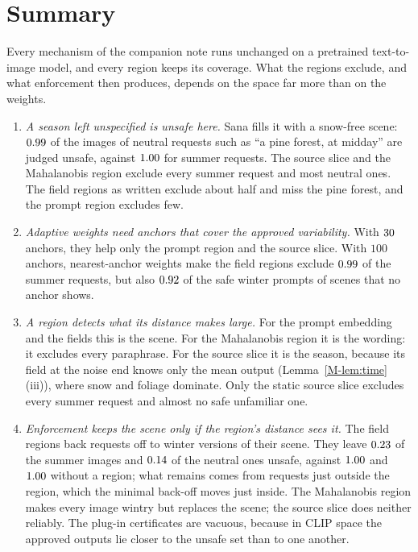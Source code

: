 \documentclass{article}
\newcommand{\mref}[1]{\ref{M-#1}}        %
\begin{document}
\section{Summary}\label{sec:summary}
Every mechanism of the companion note runs unchanged on a pretrained text-to-image model, and every region keeps its coverage. What
the regions exclude, and what enforcement then produces, depends on the space far more than on the weights.
\begin{enumerate}[label=(Q\arabic*)]
\item \emph{A season left unspecified is unsafe here.} Sana fills it with a snow-free scene: $0.99$ of the images of
neutral requests such as ``a pine forest, at midday'' are judged unsafe, against $1.00$ for summer requests. The source
slice and the Mahalanobis region exclude every summer request and most neutral ones. The field regions as written exclude about half
and miss the pine forest, and the prompt region excludes few.
\item \emph{Adaptive weights need anchors that cover the approved variability.} With $30$ anchors, they help only the prompt
region and the source slice. With $100$ anchors, nearest-anchor weights make the field regions exclude $0.99$ of the
summer requests, but also $0.92$ of the safe winter prompts of scenes that no anchor shows.
\item \emph{A region detects what its distance makes large.} For the prompt embedding and the fields this is the scene. For the
Mahalanobis region it is the wording: it excludes every paraphrase. For the source slice it is the season, because its field at the
noise end knows only the mean output (Lemma~\mref{lem:time}(iii)), where snow and foliage dominate. Only the static source slice
excludes every summer request and almost no safe unfamiliar one.
\item \emph{Enforcement keeps the scene only if the region's distance sees it.} The field regions back requests off to winter
versions of their scene. They leave $0.23$ of the summer images and $0.14$ of the neutral ones unsafe, against
$1.00$ and $1.00$ without a region; what remains comes from requests just outside the region, which the
minimal back-off moves just inside. The Mahalanobis region makes every image wintry but replaces the scene; the source slice does
neither reliably. The plug-in certificates are vacuous, because in CLIP space the approved outputs lie closer to the unsafe set than
to one another.
\end{enumerate}
\end{document}
